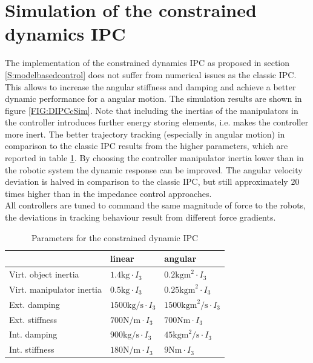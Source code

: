 \documentclass[a4paper,twoside, openright,12pt]{report}
\begin{document}
\section{Simulation of the constrained dynamics IPC}
The implementation of the constrained dynamics IPC as proposed in section \ref{S:modelbasedcontrol} does not suffer from numerical issues as the classic IPC. This allows to increase the angular stiffness and damping and achieve a better dynamic performance for a angular motion. The simulation results are shown in figure \ref{FIG:DIPCcSim}. Note that including the inertias of the manipulators in the controller introduces further energy storing elements, i.e. makes the controller more inert. The better trajectory tracking (especially in angular motion) in comparison to the classic IPC results from the higher parameters, which are reported in table \ref{TAB:DIPCcParameters}. By choosing the controller manipulator inertia lower than in the robotic system the dynamic response can be improved. The angular velocity deviation is halved in comparison to the classic IPC, but still approximately $20$ times higher than in the impedance control approaches.\\
All controllers are tuned to command the same magnitude of force to the robots, the deviations in tracking behaviour result from different force gradients.
\begin{table}
	\centering
	\caption[Parameters for the constrained dynamic IPC]{Parameters for the constrained dynamic IPC}\vspace{10pt}
	\label{TAB:DIPCcParameters}
	
	\begin{tabular}{ l | l | l }
	 & linear & angular \\ \hline
	Virt. object inertia & $1.4 \text{kg} \cdot I_3$ & $0.2 \text{kgm}^2 \cdot I_3$ \\ \hline
	Virt. manipulator inertia & $0.5 \text{kg} \cdot I_3$ & $0.25 \text{kgm}^2 \cdot I_3$ \\ \hline 
	Ext. damping	 & $1500 \text{kg/s} \cdot I_3$ & $1500 \text{kgm}^2 \text{/s} \cdot I_3$ \\ \hline
	Ext. stiffness & $700 \text{N/m} \cdot I_3$ & $700 \text{Nm} \cdot  I_3$ \\ \hline
	Int. damping & $900 \text{kg/s} \cdot I_3$ & $45 \text{kgm}^2 \text{/s} \cdot I_3 $ \\ \hline
	Int. stiffness & $180 \text{N/m} \cdot I_3$ & $9 \text{Nm} \cdot I_3$\\ \hline
\end{tabular}
\end{table}
  
\end{document}
